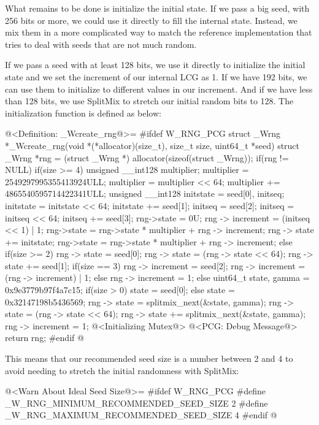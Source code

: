 What remains to be done is initialize the initial state. If we pass a
big seed, with 256 bits or more, we could use it directly to fill the
internal state. Instead, we mix them in a more complicated way to
match the reference implementation that tries to deal with seeds that
are not much random.

If we pass a seed with at least 128 bits, we use it directly to
initialize the initial state and we set the increment of our internal
LCG as 1. If we have 192 bits, we can use them to initialize to
different values in our increment. And if we have less than 128 bits,
we use SplitMix to stretch our initial random bits to 128. The
initialization function is defined as below:

\iniciocodigo
@<Definition: \_Wcreate\_rng@>=
#ifdef W_RNG_PCG
struct _Wrng *_Wcreate_rng(void *(*allocator)(size_t), size_t size,
                           uint64_t *seed){
  struct _Wrng *rng = (struct _Wrng *) allocator(sizeof(struct _Wrng));
  if(rng != NULL){
    if(size >= 4){
      unsigned __int128 multiplier;
      multiplier = 2549297995355413924ULL;
      multiplier = multiplier << 64;
      multiplier += 4865540595714422341ULL;
      unsigned __int128 initstate = seed[0], initseq;
      initstate = initstate << 64;
      initstate += seed[1];
      initseq = seed[2];
      initseq = initseq << 64;
      initseq += seed[3];
      rng->state = 0U;
      rng -> increment = (initseq << 1) | 1;
      rng->state = rng->state * multiplier + rng -> increment;
      rng -> state += initstate;
      rng->state = rng->state * multiplier + rng -> increment;
    }
    else if(size >= 2){
      rng -> state = seed[0];
      rng -> state = (rng -> state << 64);
      rng -> state += seed[1];
      if(size == 3){
        rng -> increment = seed[2];
        rng -> increment = (rng -> increment) | 1;
      }
      else
        rng -> increment = 1;
    }
    else{
      uint64_t state, gamma = 0x9e3779b97f4a7c15;
      if(size > 0)
        state = seed[0];
      else
        state = 0x32147198b5436569;
      rng -> state = splitmix_next(&state, gamma);
      rng -> state = (rng -> state << 64);
      rng -> state += splitmix_next(&state, gamma);
      rng -> increment = 1;
    }                           
    @<Initializing Mutex@>
    @<PCG: Debug Message@>
  }
  return rng;
}
#endif
@
\fimcodigo

This means that our recommended seed size is a number between 2 and 4
to avoid needing to stretch the initial randomness with SplitMix:

\iniciocodigo
@<Warn About Ideal Seed Size@>=
#ifdef W_RNG_PCG
#define _W_RNG_MINIMUM_RECOMMENDED_SEED_SIZE  2
#define _W_RNG_MAXIMUM_RECOMMENDED_SEED_SIZE  4
#endif
@
\fimcodigo

